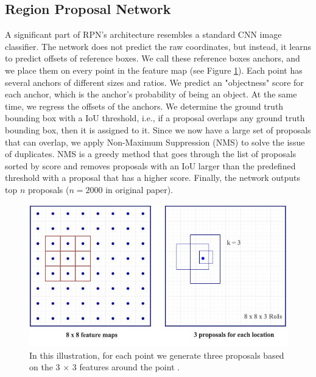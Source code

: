 \subsection{Region Proposal Network}\label{rpn}
A significant part of RPN's architecture resembles a standard CNN image classifier. The network does not predict the raw coordinates, but instead, it learns to predict offsets of reference boxes. We call these reference boxes anchors, and we place them on every point in the feature map (see Figure \ref{fig:rpn}). Each point has several anchors of different sizes and ratios. We predict an "objectness" score for each anchor, which is the anchor's probability of being an object. At the same time, we regress the offsets of the anchors. We determine the ground truth bounding box with a IoU threshold, i.e., if a proposal overlaps any ground truth bounding box, then it is assigned to it. Since we now have a large set of proposals that can overlap, we apply Non-Maximum Suppression (NMS) to solve the issue of duplicates. NMS is a greedy method that goes through the list of proposals sorted by score and removes proposals with an IoU larger than the predefined threshold with a proposal that has a higher score. Finally, the network outputs top $n$ proposals ($n = 2000$ in original paper).

\begin{figure}[h]
    \centering
    \includegraphics[width=0.6\linewidth]{Sources/Figures/rpn.jpeg}
    \caption{In this illustration, for each point we generate three proposals based on the 3 $\times$ 3 features around the point \cite{huifasterrcnn}.}
    \label{fig:rpn}
\end{figure}

